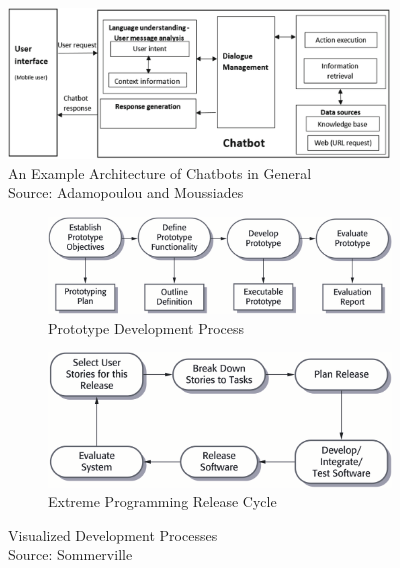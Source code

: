 \begin{figure}[t]
\centering
\captionsetup{justification=centering}
\includegraphics[width=0.9\textwidth]{graphics/chatbot-architecture-general.png}
\caption{An Example Architecture of Chatbots in General \\Source: Adamopoulou and Moussiades \cite{adamopoulou_overview_2020}}
\label{fig:chatbot-architecture-general}
\end{figure}

\begin{figure}[h]
\centering
  \begin{subfigure}{.7\textwidth}
    \includegraphics[width=\textwidth]{graphics/prototype-dev.png}
    \caption{Prototype Development Process}
    \label{fig:prototype-process}
  \end{subfigure} \hfill
  \begin{subfigure}{.63\textwidth}
    \includegraphics[width=\textwidth]{graphics/extreme-programming-release-cycle.png}
    \caption{Extreme Programming Release Cycle}
    \label{fig:extreme-prog-cycle}
    \end{subfigure}
  \caption{Visualized Development Processes \\ Source: Sommerville \cite{sommerville_software_2011}}
  \label{fig:dev-processes}
\end{figure}

